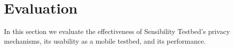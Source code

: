 \section{Evaluation}

In this section we evaluate the effectiveness of Sensibility Testbed's 
privacy mechanisms, its usability as a mobile testbed, and its 
performance.